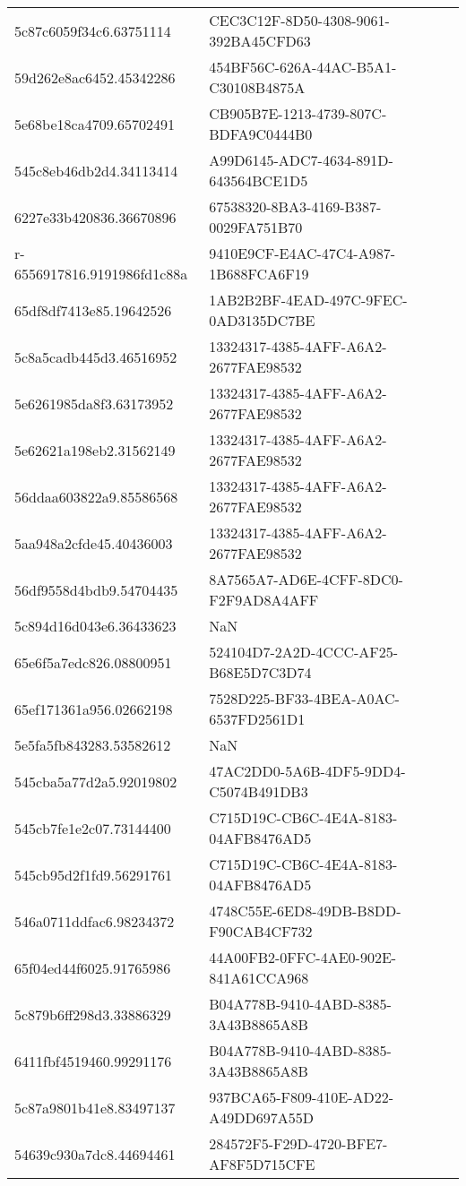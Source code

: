 \begin{tabular}{ll}
5c87c6059f34c6.63751114 & CEC3C12F-8D50-4308-9061-392BA45CFD63 \\
59d262e8ac6452.45342286 & 454BF56C-626A-44AC-B5A1-C30108B4875A \\
5e68be18ca4709.65702491 & CB905B7E-1213-4739-807C-BDFA9C0444B0 \\
545c8eb46db2d4.34113414 & A99D6145-ADC7-4634-891D-643564BCE1D5 \\
6227e33b420836.36670896 & 67538320-8BA3-4169-B387-0029FA751B70 \\
r-6556917816.9191986fd1c88a & 9410E9CF-E4AC-47C4-A987-1B688FCA6F19 \\
65df8df7413e85.19642526 & 1AB2B2BF-4EAD-497C-9FEC-0AD3135DC7BE \\
5c8a5cadb445d3.46516952 & 13324317-4385-4AFF-A6A2-2677FAE98532 \\
5e6261985da8f3.63173952 & 13324317-4385-4AFF-A6A2-2677FAE98532 \\
5e62621a198eb2.31562149 & 13324317-4385-4AFF-A6A2-2677FAE98532 \\
56ddaa603822a9.85586568 & 13324317-4385-4AFF-A6A2-2677FAE98532 \\
5aa948a2cfde45.40436003 & 13324317-4385-4AFF-A6A2-2677FAE98532 \\
56df9558d4bdb9.54704435 & 8A7565A7-AD6E-4CFF-8DC0-F2F9AD8A4AFF \\
5c894d16d043e6.36433623 & NaN \\
65e6f5a7edc826.08800951 & 524104D7-2A2D-4CCC-AF25-B68E5D7C3D74 \\
65ef171361a956.02662198 & 7528D225-BF33-4BEA-A0AC-6537FD2561D1 \\
5e5fa5fb843283.53582612 & NaN \\
545cba5a77d2a5.92019802 & 47AC2DD0-5A6B-4DF5-9DD4-C5074B491DB3 \\
545cb7fe1e2c07.73144400 & C715D19C-CB6C-4E4A-8183-04AFB8476AD5 \\
545cb95d2f1fd9.56291761 & C715D19C-CB6C-4E4A-8183-04AFB8476AD5 \\
546a0711ddfac6.98234372 & 4748C55E-6ED8-49DB-B8DD-F90CAB4CF732 \\
65f04ed44f6025.91765986 & 44A00FB2-0FFC-4AE0-902E-841A61CCA968 \\
5c879b6ff298d3.33886329 & B04A778B-9410-4ABD-8385-3A43B8865A8B \\
6411fbf4519460.99291176 & B04A778B-9410-4ABD-8385-3A43B8865A8B \\
5c87a9801b41e8.83497137 & 937BCA65-F809-410E-AD22-A49DD697A55D \\
54639c930a7dc8.44694461 & 284572F5-F29D-4720-BFE7-AF8F5D715CFE \\

\end{tabular}

